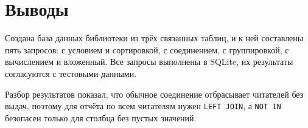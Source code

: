 \section{Выводы}
Создана база данных библиотеки из трёх связанных таблиц, и к ней составлены пять запросов:
с условием и сортировкой, с соединением, с группировкой, с вычислением и вложенный. Все
запросы выполнены в SQLite, их результаты согласуются с тестовыми данными.

Разбор результатов показал, что обычное соединение отбрасывает читателей без выдач, поэтому
для отчёта по всем читателям нужен \texttt{LEFT JOIN}, а \texttt{NOT IN} безопасен только
для столбца без пустых значений.
